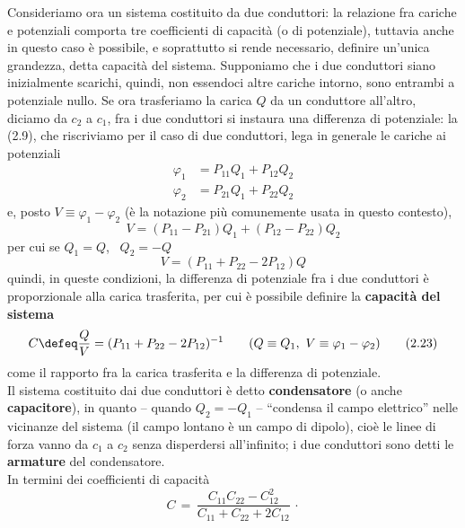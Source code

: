 Consideriamo ora un sistema costituito da due conduttori: la relazione fra
cariche e potenziali comporta tre coefficienti di capacit\`a (o di potenziale),
tuttavia anche in questo caso \`e possibile, e soprattutto si rende necessario,
definire un'unica grandezza, detta capacit\`a del sistema. Supponiamo che i due
conduttori siano inizialmente scarichi, quindi, non essendoci altre cariche
intorno, sono entrambi a potenziale nullo. Se ora trasferiamo la carica $Q$ da
un conduttore all'altro, diciamo da $c_2$ a $c_1$, fra i due conduttori si
instaura una differenza di potenziale: la (2.9), che riscriviamo per il caso di
due conduttori, lega in generale le cariche ai potenziali
\begin{equation}
  \begin{aligned}
    \varphi_1&=P_{11}Q_1+P_{12}Q_2\\
    \varphi_2&=P_{21}Q_1+P_{22}Q_2
  \end{aligned}
  \tag{2.20}
\end{equation}
e, posto $V\equiv\varphi_1-\varphi_2$ (\`e la notazione pi\`u comunemente usata
in questo contesto),
\begin{equation}
  V=(P_{11}-P_{21})Q_1+(P_{12}-P_{22})Q_2
  \tag{2.21}
\end{equation}
per cui se $Q_1=Q$, \ $Q_2=-Q$
\begin{equation}
  V=(P_{11}+P_{22}-2P_{12})Q
  \tag{2.22}
\end{equation}
quindi, in queste condizioni, la differenza di potenziale fra i due conduttori
\`e proporzionale alla carica trasferita, per cui \`e possibile definire la
\textbf{capacit\`a del sistema}
\begin{equation}
  C\defeq\frac QV=(P_{11}+P_{22}-2P_{12})^{-1}
  \qquad(Q\equiv Q_1,\ V\equiv\varphi_1-\varphi_2)
  \tag{2.23}
\end{equation}
come il rapporto fra la carica trasferita e la differenza di potenziale.\\
Il sistema costituito dai due conduttori \`e detto \textbf{condensatore} (o
anche \textbf{capacitore}), in quanto -- quando $Q_2=-Q_1$ -- ``condensa il
campo elettrico'' nelle vicinanze del sistema (il campo lontano \`e un campo di
dipolo), cio\`e le linee di forza vanno da $c_1$ a $c_2$ senza disperdersi
all'infinito; i due conduttori sono detti le \textbf{armature} del
condensatore.\\
In termini dei coefficienti di capacit\`a
\begin{equation}
  C\,=\,\frac{C_{11}C_{22}-C_{12}^2}{C_{11}+C_{22}+2C_{12}}\,\cdot
  \tag{2.24}
\end{equation}
